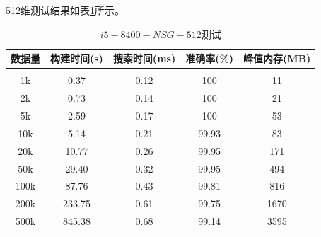 \documentclass[a4paper, 11pt, UTF8]{ctexart}%
\begin{document}
512维测试结果如表\ref{tab:i5-8400-NSG-512}所示。
\begin{table}[H]
\caption{$i5-8400-NSG-512$测试}
\label{tab:i5-8400-NSG-512}
\begin{center}
\begin{tabular}{ccccc}
\multicolumn{1}{c}{\bf 数据量}  &\multicolumn{1}{c}{\bf 构建时间(s)}  &\multicolumn{1}{c}{\bf 搜索时间(ms)}  &\multicolumn{1}{c}{\bf 准确率(\%)}  &\multicolumn{1}{c}{\bf 峰值内存(MB)}
\\ \hline \\
1k & 0.37 & 0.12 & 100 & 11\\
2k & 0.73 & 0.14 & 100 & 21\\
5k & 2.59 & 0.17 & 100 & 53\\
10k & 5.14 & 0.21 & 99.93 & 83\\
20k & 10.77 & 0.26 & 99.95 & 171\\
50k & 29.40 & 0.32 & 99.95 & 494\\
100k & 87.76 & 0.43 & 99.81 & 816\\
200k & 233.75 & 0.61 & 99.75 & 1670\\
500k & 845.38 & 0.68 & 99.14 & 3595\\
\end{tabular}
\end{center}
\end{table}
\end{document}
